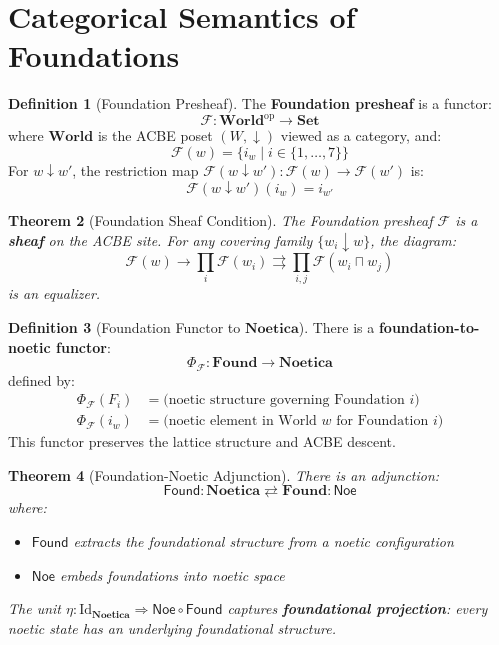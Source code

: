 \documentclass[11pt,twoside,openright]{book}
\theoremstyle{definition}
\newtheorem{definition}{Definition}[chapter]
\theoremstyle{plain}
\newtheorem{theorem}[definition]{Theorem}
\theoremstyle{remark}
\newcommand{\Foundations}{\mathcal{F}}
\newcommand{\Noetica}{\mathbf{Noetica}}
\begin{document}
\section{Categorical Semantics of Foundations}
\label{sec:foundation-semantics}

\begin{definition}[Foundation Presheaf]
\label{def:foundation-presheaf}
The \textbf{Foundation presheaf} is a functor:
\[
\mathcal{F} : \mathbf{World}^{\mathrm{op}} \to \mathbf{Set}
\]
where $\mathbf{World}$ is the ACBE poset $(W, \downarrow)$ viewed as a category, and:
\[
\mathcal{F}(w) = \{i_w \mid i \in \{1, \ldots, 7\}\}
\]
For $w \downarrow w'$, the restriction map $\mathcal{F}(w \downarrow w') : \mathcal{F}(w) \to \mathcal{F}(w')$ is:
\[
\mathcal{F}(w \downarrow w')(i_w) = i_{w'}
\]
\end{definition}

\begin{theorem}[Foundation Sheaf Condition]
\label{thm:foundation-sheaf}
The Foundation presheaf $\mathcal{F}$ is a \textbf{sheaf} on the ACBE site. For any covering family $\{w_i \downarrow w\}$, the diagram:
\[
\mathcal{F}(w) \to \prod_i \mathcal{F}(w_i) \rightrightarrows \prod_{i,j} \mathcal{F}(w_i \sqcap w_j)
\]
is an equalizer.
\end{theorem}

\begin{definition}[Foundation Functor to $\Noetica$]
\label{def:foundation-noetica-functor}
There is a \textbf{foundation-to-noetic functor}:
\[
\Phi_\Foundations : \mathbf{Found} \to \Noetica
\]
defined by:
\begin{align*}
  \Phi_\Foundations(F_i) &= \text{(noetic structure governing Foundation } i\text{)} \\
  \Phi_\Foundations(i_w) &= \text{(noetic element in World } w \text{ for Foundation } i\text{)}
\end{align*}
This functor preserves the lattice structure and ACBE descent.
\end{definition}

\begin{theorem}[Foundation-Noetic Adjunction]
\label{thm:foundation-noetic-adjunction}
There is an adjunction:
\[
\mathsf{Found} : \Noetica \rightleftarrows \mathbf{Found} : \mathsf{Noe}
\]
where:
\begin{itemize}
  \item $\mathsf{Found}$ extracts the foundational structure from a noetic configuration
  \item $\mathsf{Noe}$ embeds foundations into noetic space
\end{itemize}
The unit $\eta : \mathrm{Id}_\Noetica \Rightarrow \mathsf{Noe} \circ \mathsf{Found}$ captures \textbf{foundational projection}: every noetic state has an underlying foundational structure.
\end{theorem}
\end{document}
